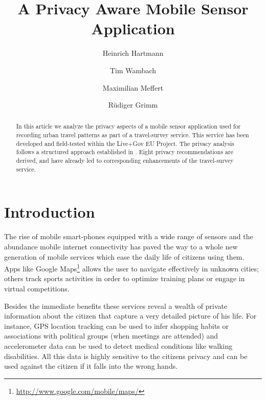 \documentclass[runningheads,a4paper]{llncs}
\begin{document}

\title{A Privacy Aware Mobile Sensor Application}

\author{Heinrich Hartmann \and Tim Wambach \and Maximilian Meffert \and R\"udiger Grimm}
\maketitle


\begin{abstract}
In this article we analyze the privacy aspects of a mobile sensor
application used for recording urban travel patterns as part of a
travel-survey service. This service has been developed and
field-tested within the Live+Gov EU Project. The privacy analysis
follows a structured approach established in
\cite{Grimm:ItSecRefModel}. Eight privacy recommendations are derived,
and have already led to corresponding enhancements of the
travel-survey service.


\end{abstract}


\section{Introduction}
\label{sec:intro}


The rise of mobile smart-phones equipped with a wide range of sensors
and the abundance mobile internet connectivity has paved the way to a
whole new generation of mobile services which ease the daily life of
citizens using them. Apps like Google
Maps\footnote{\url{http://www.google.com/mobile/maps/}} allows the user to
navigate effectively in unknown cities; others track sports activities
in order to optimize training plans or engage in virtual competitions.

Besides the immediate benefits these services reveal a wealth of
private information about the citizen that capture a very detailed
picture of his life. For instance, GPS location tracking can be used
to infer shopping habits or associations with political groups (when
meetings are attended) and accelerometer data can be used to detect
medical conditions like walking disabilities. All this data is highly
sensitive to the citizens privacy and can be used against the citizen
if it falls into the wrong hands.
\end{document}
